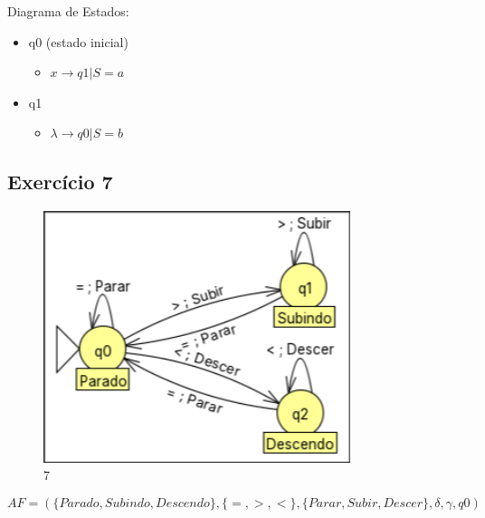\documentclass[a4paper,12pt]{article}
\begin{document}
        Diagrama de Estados:
        \begin{itemize}
            \item q0 (estado inicial)
                \begin{itemize}
                    \item $x \to q1 | S = a$
                \end{itemize}
            \item q1
                \begin{itemize}
                    \item $\lambda \to q0 | S = b$
                \end{itemize}
        \end{itemize}

    \subsection{Exercício 7}
        \begin{figure}[H]
            \centering
            \includegraphics[width=0.8\textwidth]{Aula07/Images/Exercicio7.png}
            \caption*{7}
        \end{figure}
        
        \[AF = (\{Parado, Subindo, Descendo\}, \{=, >, <\}, \{Parar, Subir, Descer\}, \delta, \gamma, q0)\]
        
\end{document}
